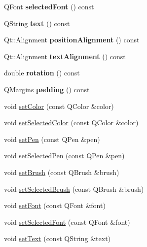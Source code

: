 \begin{DoxyCompactItemize}
\mbox{\label{classQCPItemText_a74c947c6193e3b47884fac84fdb29922}} 
Q\+Font {\bfseries selected\+Font} () const
\item 
\mbox{\label{classQCPItemText_ad71c9e83ee3556d9d617eca854e8eb18}} 
Q\+String {\bfseries text} () const
\item 
\mbox{\label{classQCPItemText_a0d946dca3008d353afd04b4337739199}} 
Qt\+::\+Alignment {\bfseries position\+Alignment} () const
\item 
\mbox{\label{classQCPItemText_a9af3198d46551e1cc7703f02c95ddfe5}} 
Qt\+::\+Alignment {\bfseries text\+Alignment} () const
\item 
\mbox{\label{classQCPItemText_a035962b4ed23ff0a89e6a8b46fa18bf1}} 
double {\bfseries rotation} () const
\item 
\mbox{\label{classQCPItemText_a5a598618350b40446d031fa9dc15fba7}} 
Q\+Margins {\bfseries padding} () const
\item 
void \hyperlink{classQCPItemText_aa51efc0841fe52da9eaf8aff6fc8a8b2}{set\+Color} (const Q\+Color \&color)
\item 
void \hyperlink{classQCPItemText_ae7ba0bdb75c897b028388e45bfd435fa}{set\+Selected\+Color} (const Q\+Color \&color)
\item 
void \hyperlink{classQCPItemText_a9b9ec6eea0eb0603977ff84d4c78d0a3}{set\+Pen} (const Q\+Pen \&pen)
\item 
void \hyperlink{classQCPItemText_a291febe586f0da3f1c392e77bef4aa20}{set\+Selected\+Pen} (const Q\+Pen \&pen)
\item 
void \hyperlink{classQCPItemText_a1c7e131516df2ed8d941ef31240ded8e}{set\+Brush} (const Q\+Brush \&brush)
\item 
void \hyperlink{classQCPItemText_a6b8377eeb2af75eb9528422671ac16cb}{set\+Selected\+Brush} (const Q\+Brush \&brush)
\item 
void \hyperlink{classQCPItemText_a94ad60ebe04f5c07c35e7c2029e96b1f}{set\+Font} (const Q\+Font \&font)
\item 
void \hyperlink{classQCPItemText_a0be2841772f83663c4db307928b82816}{set\+Selected\+Font} (const Q\+Font \&font)
\item 
void \hyperlink{classQCPItemText_a3dacdda0ac88f99a05b333b977c48747}{set\+Text} (const Q\+String \&text)

\end{DoxyCompactItemize}
